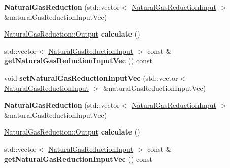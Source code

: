 \begin{DoxyCompactItemize}
\item 
\mbox{\label{class_natural_gas_reduction_a7648caebf3f12a0c7bb347e9d18e64d8}} 
{\bfseries Natural\+Gas\+Reduction} (std\+::vector$<$ \hyperlink{class_natural_gas_reduction_input}{Natural\+Gas\+Reduction\+Input} $>$ \&natural\+Gas\+Reduction\+Input\+Vec)
\item 
\mbox{\label{class_natural_gas_reduction_ae9eed40d094032c9b7a493e995d6d21d}} 
\hyperlink{struct_natural_gas_reduction_1_1_output}{Natural\+Gas\+Reduction\+::\+Output} {\bfseries calculate} ()
\item 
\mbox{\label{class_natural_gas_reduction_a3ad91a742c48fd1fcc39e8371efa46b6}} 
std\+::vector$<$ \hyperlink{class_natural_gas_reduction_input}{Natural\+Gas\+Reduction\+Input} $>$ const  \& {\bfseries get\+Natural\+Gas\+Reduction\+Input\+Vec} () const
\item 
\mbox{\label{class_natural_gas_reduction_a37d449a4d5f274fdebb855c1f8d0d32d}} 
void {\bfseries set\+Natural\+Gas\+Reduction\+Input\+Vec} (std\+::vector$<$ \hyperlink{class_natural_gas_reduction_input}{Natural\+Gas\+Reduction\+Input} $>$ \&natural\+Gas\+Reduction\+Input\+Vec)
\item 
\mbox{\label{class_natural_gas_reduction_a7648caebf3f12a0c7bb347e9d18e64d8}} 
{\bfseries Natural\+Gas\+Reduction} (std\+::vector$<$ \hyperlink{class_natural_gas_reduction_input}{Natural\+Gas\+Reduction\+Input} $>$ \&natural\+Gas\+Reduction\+Input\+Vec)
\item 
\mbox{\label{class_natural_gas_reduction_ae9eed40d094032c9b7a493e995d6d21d}} 
\hyperlink{struct_natural_gas_reduction_1_1_output}{Natural\+Gas\+Reduction\+::\+Output} {\bfseries calculate} ()
\item 
\mbox{\label{class_natural_gas_reduction_a3ad91a742c48fd1fcc39e8371efa46b6}} 
std\+::vector$<$ \hyperlink{class_natural_gas_reduction_input}{Natural\+Gas\+Reduction\+Input} $>$ const  \& {\bfseries get\+Natural\+Gas\+Reduction\+Input\+Vec} () const
\item 

\end{DoxyCompactItemize}
